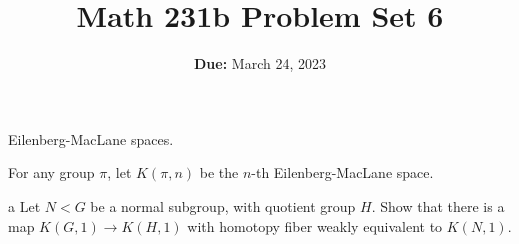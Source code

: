 \documentclass[11pt,letterpaper]{article}
\title{\textbf{Math 231b Problem Set 6}}
\date{\textbf{Due:} March 24, 2023}
\begin{document}
\maketitle

\begin{problem}
    Eilenberg-MacLane spaces.
\end{problem}

\begin{solution}
    For any group $\pi$, let $K(\pi, n)$ be the $n$-th Eilenberg-MacLane space. 
    \begin{partproblem}{a}
        Let $N < G$ be a normal subgroup, with quotient group $H$. Show that there is a map $K(G,1) \to K(H,1)$ with homotopy fiber weakly equivalent to $K(N,1)$.
    \end{partproblem} 


\end{solution}
\end{document}
